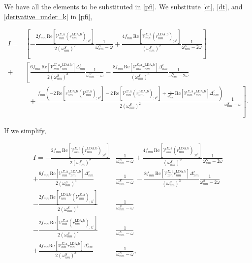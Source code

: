 \documentclass[10pt]{article}
\begin{document}
We have all the elements to be substituted in \eqref{pfi}. We substitute \eqref{ct}, \eqref{dt}, and \eqref{derivative_under_k} in \eqref{pfi},

\begin{align*}
I
= &\left[-\frac{2f_{mn}\,\mathrm{Re}\left[\mathcal{V}^{\Sigma,\text{a}}_{mn}\left(r^{\text{LDA,b}}_{nm}\right)_{;k^{\text{c}}}\right]}{2(\omega^{S}_{nm})^{2}}\frac{1}{\omega^{S}_{nm}-\omega} + \frac{4f_{mn}\,\mathrm{Re}\left[\mathcal{V}^{\Sigma,\text{a}}_{mn}\left(r^{\text{LDA,b}}_{nm}\right)_{;k^{\text{c}}}\right]}{(\omega^{S}_{nm})^{2}}\frac{1}{\omega^{S}_{nm}-2\omega}\right]\nonumber\\
+ &\left[\frac{6f_{mn}\,\mathrm{Re}\left[\mathcal{V}^{\Sigma,\text{a}}_{mn}r^{\text{LDA,b}}_{nm}\right]\Delta^{\text{c}}_{nm}}{2(\omega^{S}_{nm})^{3}}\frac{1}{\omega^{S}_{nm}-\omega} 
- \frac{8f_{mn}\,\mathrm{Re}\left[\mathcal{V}^{\Sigma,\text{a}}_{mn}r^{\text{LDA,b}}_{nm}\right]\Delta^{\text{c}}_{nm}}{(\omega^{S}_{nm})^{3}}\frac{1}{\omega^{S}_{nm}-2\omega}\right.\nonumber\\
&\,\,\,+ \left.\frac{f_{mn}\left(-2\,\mathrm{Re}\left[r^{\text{LDA,b}}_{nm}\left(\mathcal{V}^{\Sigma,\text{a}}_{mn}\right)_{;k^{\text{c}}}\right] - 2\,\mathrm{Re}\left[\mathcal{V}^{\Sigma,\text{a}}_{mn}\left(r^{\text{LDA,b}}_{nm}\right)_{;k^{\text{c}}}\right] + \frac{4}{\omega^{S}_{nm}}\,\mathrm{Re}\left[\mathcal{V}^{\Sigma,\text{a}}_{nm}r^{\text{LDA,b}}_{mn}\right]\Delta_{nm}^{\text{c}}\right)}{2(\omega^{S}_{nm})^{2}}\frac{1}{\omega^S_{nm}-\omega}\right].
\end{align*}

If we simplify,

\begin{align}\label{simplified_i} 
I =
-\frac{2f_{mn}\,\mathrm{Re}\left[\mathcal{V}^{\Sigma,\text{a}}_{mn}\left(r^{\text{LDA,b}}_{nm}\right)_{;k^{\text{c}}}\right]}{2(\omega^{S}_{nm})^{2}}&\frac{1}{\omega^{S}_{nm}-\omega}
+ \frac{4f_{mn}\,\mathrm{Re}\left[\mathcal{V}^{\Sigma,\text{a}}_{mn}\left(r^{\text{LDA,b}}_{nm}\right)_{;k^{\text{c}}}\right]}{(\omega^{S}_{nm})^{2}}\frac{1}{\omega^{S}_{nm}-2\omega}\nonumber\\
+ \frac{6f_{mn}\,\mathrm{Re}\left[\mathcal{V}^{\Sigma,\text{a}}_{mn}r^{\text{LDA,b}}_{nm}\right]\Delta^{\text{c}}_{nm}}{2(\omega^{S}_{nm})^{3}}&\frac{1}{\omega^{S}_{nm}-\omega} 
\,- \frac{8f_{mn}\,\mathrm{Re}\left[\mathcal{V}^{\Sigma,\text{a}}_{mn}r^{\text{LDA,b}}_{nm}\right]\Delta^{\text{c}}_{nm}}{(\omega^{S}_{nm})^{3}}\frac{1}{\omega^{S}_{nm}-2\omega}\nonumber\\
- \frac{2f_{mn}\,\mathrm{Re}\left[r^{\text{LDA,b}}_{nm}\left(\mathcal{V}^{\Sigma,\text{a}}_{mn}\right)_{;k^{\text{c}}}\right]}{2(\omega^{S}_{nm})^{2}}&\frac{1}{\omega^{S}_{nm}-\omega}\nonumber\\
- \frac{2f_{mn}\,\mathrm{Re}\left[\mathcal{V}^{\Sigma,\text{a}}_{mn}\left(r^{\text{LDA,b}}_{nm}\right)_{;k^{\text{c}}}\right]}{2(\omega^{S}_{nm})^{2}}&\frac{1}{\omega^{S}_{nm}-\omega}\nonumber\\
+ \frac{4f_{mn}\mathrm{Re}\left[\mathcal{V}^{\Sigma,\text{a}}_{nm}r^{\text{LDA,b}}_{mn}\right]\Delta_{nm}^{\text{c}}}{2(\omega^{S}_{nm})^{3}}&\frac{1}{\omega^{S}_{nm}-\omega},
\end{align}
\end{document}
